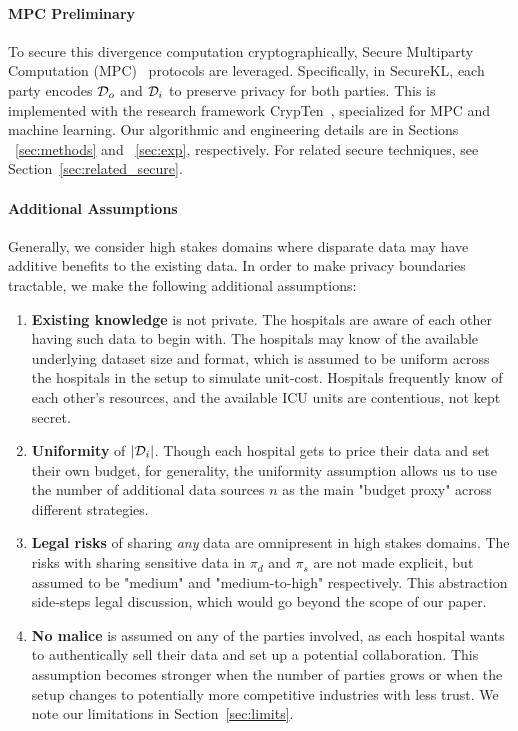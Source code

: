 \paragraph{MPC Preliminary}
To secure this divergence computation cryptographically, Secure Multiparty Computation (MPC)~\cite{yao1982protocols, shamir1979share} protocols are leveraged. Specifically, in $\mathrm{SecureKL}$, each party encodes $\mathcal{D}_o$ and $\mathcal{D}_i$ to preserve privacy for both parties. This is implemented with the research framework CrypTen~\cite{knott2021crypten}, specialized for MPC and machine learning. Our algorithmic and engineering details are in Sections ~\ref{sec:methods} and ~\ref{sec:exp}, respectively. For related secure techniques, see Section~\ref{sec:related_secure}.
\paragraph{Additional Assumptions }


Generally, we consider high stakes domains where disparate data may have additive benefits to the existing data.
In order to make privacy boundaries tractable, we make the following additional assumptions:
\begin{enumerate}
\itemsep0em
\item \textbf{Existing knowledge} is not private. The hospitals are aware of each other having such data to begin with. The hospitals may know of the available underlying dataset size and format, which is assumed to be uniform across the hospitals in the setup to simulate unit-cost. Hospitals frequently know of each other's resources, and the available ICU units are contentious, not kept secret. 
\item \textbf{Uniformity} of $|\mathcal{D}_i|$. Though each hospital gets to price their data and set their own budget, for generality, the uniformity assumption allows us to use the number of additional data sources $n$ as the main "budget proxy" across different strategies.
\item \textbf{Legal risks} of sharing \emph{any} data are omnipresent in high stakes domains. The risks with sharing sensitive data in $\pi_d$ and $\pi_s$ are not made explicit, but assumed to be "medium" and "medium-to-high" respectively. This abstraction side-steps legal discussion, which would go beyond the scope of our paper.
\item \textbf{No malice} is assumed on any of the parties involved, as each hospital wants to authentically sell their data and set up a potential collaboration. This assumption becomes stronger when the number of parties grows or when the setup changes to potentially more competitive industries with less trust. We note our limitations in Section~\ref{sec:limits}.
\end{enumerate}